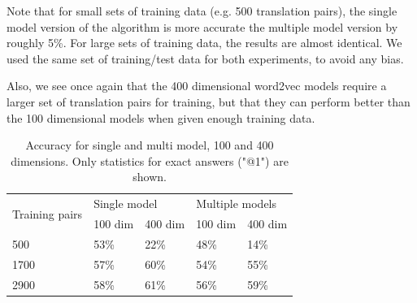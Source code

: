 Note that for small sets of training data (e.g. 500 translation pairs), the single model version of the algorithm is more accurate the multiple model version by roughly 5\%. For large sets of training data, the results are almost identical. We used the same set of training/test data for both experiments, to avoid any bias.

Also, we see once again that the 400 dimensional word2vec models require a larger set of translation pairs for training, but that they can perform better than the 100 dimensional models when given enough training data.

\begin{table}[]
  \centering
  \label{table:graphdata}
  \begin{tabular}{|l|l|l|l|l|}
    \hline
    \multirow{2}{*}{Training pairs} & \multicolumn{2}{l|}{Single model} & \multicolumn{2}{l|}{Multiple models} \\ \cline{2-5} 
                                    & 100 dim         & 400 dim         & 100 dim           & 400 dim          \\ \hline
    500                             & 53\%            & 22\%            & 48\%              & 14\%             \\ \hline
    1700                            & 57\%            & 60\%            & 54\%              & 55\%             \\ \hline
    2900                            & 58\%            & 61\%            & 56\%              & 59\%             \\ \hline
  \end{tabular}
  \caption{Accuracy for single and multi model, 100 and 400 dimensions. Only statistics for exact answers ("@1") are shown.}
\end{table}


